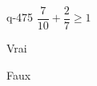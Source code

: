 \begin{truefalse}{q-475}
$\dfrac{7}{10} + \dfrac{2}{7} \geq 1$
\item Vrai
\item* Faux
\end{truefalse}

